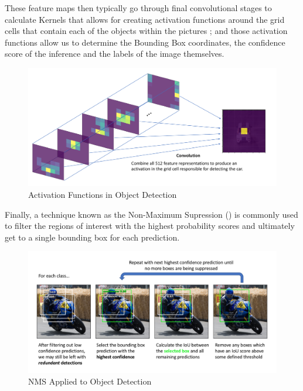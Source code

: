 \documentclass[openright]{normas-utf-tex} %
\begin{document}
These feature maps then typically go through final convolutional stages to calculate Kernels that allows for creating 
activation functions around the grid cells that contain each of the objects within the pictures \cite{JeremyJordan};
and those activation functions allow us to determine the Bounding Box coordinates, the confidence score of the inference 
and the labels of the image themselves. 

\begin{figure}[H]
	\centering
	\includegraphics[width=1\textwidth]{./images/convolution-activation.png}
	\caption[Activation Functions in Object Detection]{Activation Functions in Object Detection}
	\label{fig:convolutionActivation}
\end{figure}

Finally, a technique known as the Non-Maximum Supression () is commonly used to filter the
regions of interest with the highest probability scores and ultimately get to a single bounding box for each prediction.

\begin{figure}[H]
	\centering
	\includegraphics[width=1\textwidth]{./images/nms-object-detection.png }
	\caption[NMS Applied to Object Detection]{NMS Applied to Object Detection}
	\label{fig:nmsObjectDetection}
\end{figure}
\end{document}
